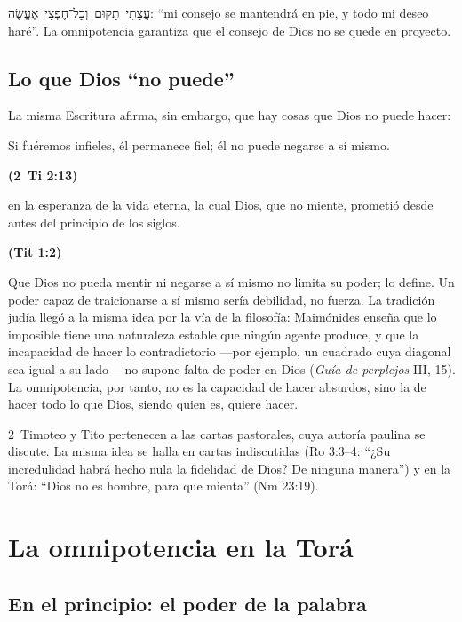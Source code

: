 \documentclass[11pt,letterpaper]{article}
\newcommand{\heb}[1]{\mbox{\foreignlanguage{hebrew}{#1}}}
\newcommand{\fuente}[1]{\par\hfill{\upshape\bfseries\small\textcolor{azul}{#1}}}
\begin{document}
\heb{עֲצָתִי תָקוּם וְכָל־חֶפְצִי אֶעֱשֶׂה}: ``mi consejo se mantendrá en pie, y todo mi deseo haré''. La omnipotencia garantiza que el consejo de Dios no se quede en proyecto.

\subsection{Lo que Dios ``no puede''}

La misma Escritura afirma, sin embargo, que hay cosas que Dios no puede hacer:

\begin{cita}Si fuéremos infieles, él permanece fiel; él no puede negarse a sí mismo.\fuente{(2~Ti 2:13)}\end{cita}

\begin{cita}en la esperanza de la vida eterna, la cual Dios, que no miente, prometió desde antes del principio de los siglos.\fuente{(Tit 1:2)}\end{cita}

Que Dios no pueda mentir ni negarse a sí mismo no limita su poder; lo define. Un poder capaz de traicionarse a sí mismo sería debilidad, no fuerza. La tradición judía llegó a la misma idea por la vía de la filosofía: Maimónides enseña que lo imposible tiene una naturaleza estable que ningún agente produce, y que la incapacidad de hacer lo contradictorio ---por ejemplo, un cuadrado cuya diagonal sea igual a su lado--- no supone falta de poder en Dios (\emph{Guía de perplejos} III, 15). La omnipotencia, por tanto, no es la capacidad de hacer absurdos, sino la de hacer todo lo que Dios, siendo quien es, quiere hacer.

\begin{nota}[Precisión]
2~Timoteo y Tito pertenecen a las cartas pastorales, cuya autoría paulina se discute. La misma idea se halla en cartas indiscutidas (Ro 3:3--4: ``¿Su incredulidad habrá hecho nula la fidelidad de Dios? De ninguna manera'') y en la Torá: ``Dios no es hombre, para que mienta'' (Nm 23:19).
\end{nota}

\section{La omnipotencia en la Torá}

\subsection{En el principio: el poder de la palabra}
\end{document}
